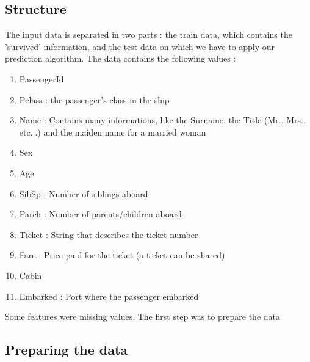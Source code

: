 \documentclass[a4paper,10pt]{report}
\begin{document}
\subsection{Structure}
The input data is separated in two parts : the train data, which contains the 'survived' information, and the test data
on which we have to apply our prediction algorithm.
The data contains the following values :
\begin{enumerate}
 \item PassengerId 
 \item Pclass : the passenger's class in the ship
 \item Name : Contains many informations, like the Surname, the Title (Mr., Mrs., etc...) and the maiden name for a married woman
 \item Sex
 \item Age 
 \item SibSp : Number of siblings aboard
 \item Parch : Number of parents/children aboard
 \item Ticket : String that describes the ticket number
 \item Fare : Price paid for the ticket (a ticket can be shared)
 \item Cabin
 \item Embarked : Port where the passenger embarked
\end{enumerate}

Some features were missing values. The first step was to prepare the data

\subsection{Preparing the data}
\end{document}
